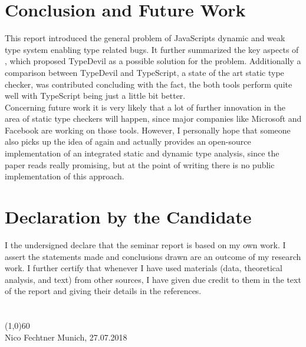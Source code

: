\documentclass[runningheads,a4paper]{llncs}
\begin{document}
\section{Conclusion and Future Work}
This report introduced the general problem of JavaScripts dynamic and weak type system enabling type related bugs.
It further summarized the key aspects of \cite{DBLP:conf/icse/PradelSS15}, which proposed TypeDevil as a possible solution for the problem.
Additionally a comparison between TypeDevil and TypeScript, a state of the art static type checker, was contributed concluding with the fact, the both tools perform quite well with TypeScript being just a little bit better.\\
Concerning future work it is very likely that a lot of further innovation in the area of static type checkers will happen, since major companies like Microsoft and Facebook are working on those tools.
However, I personally hope that someone also picks up the idea of \cite{DBLP:conf/icse/TanXCLYS17} again and actually provides an open-source implementation of an integrated static and dynamic type analysis, since the paper reads really promising, but at the point of writing there is no public implementation of this approach.  


\newpage

{}


\newpage

\section*{Declaration by the Candidate}
I the undersigned declare that the seminar report is based on my own work.
I assert the statements made and conclusions drawn are an outcome of my research work. I further certify that whenever I have used materials (data, theoretical analysis, and text) from other sources, I have given due credit to them in the text of the report and giving their details in the references.
\\ \\ \\
\line(1,0){60}\\
Nico Fechtner
\hfill
Munich, 27.07.2018
\end{document}
